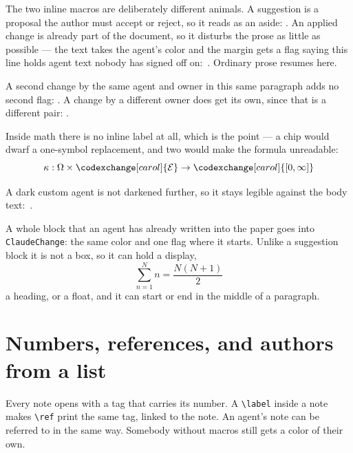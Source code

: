 \documentclass{article}
\begin{document}
The two inline macros are deliberately different animals.  A suggestion is a
proposal the author must accept or reject, so it reads as an aside:
.  An applied
change is already part of the document, so it disturbs the prose as little as
possible --- the text takes the agent's color and the margin gets a flag saying
this line holds agent text nobody has signed off
on:\ .  Ordinary prose resumes here.

A second change by the same agent and owner in this same paragraph adds no
second flag: .  A change by a
different owner does get its own, since that is a different pair:
.

Inside math there is no inline label at all, which is the point --- a chip would
dwarf a one-symbol replacement, and two would make the formula unreadable:
\[ \kappa : \Omega \times \codexchange[carol]{\mathcal{E}}
   \to \codexchange[carol]{[0,\infty]} \]

A dark custom agent is not darkened further, so it stays legible against the
body text:\ .

\begin{ClaudeChange}[alice]
A whole block that an agent has already written into the paper goes into
\texttt{ClaudeChange}: the same color and one flag where it starts.  Unlike a
suggestion block it is not a box, so it can hold a display,
\[ \sum_{n=1}^{N} n = \frac{N(N+1)}{2} \]
a heading, or a float, and it can start or end in the middle of a paragraph.
\end{ClaudeChange}

\section{Numbers, references, and authors from a list}

Every note opens with a tag that carries its number.  A \texttt{\textbackslash label} inside
a note makes \texttt{\textbackslash ref} print the same tag, linked to the
note.  An agent's note can be referred to
in the same way.  Somebody without macros still gets a color of
their own.
\end{document}
